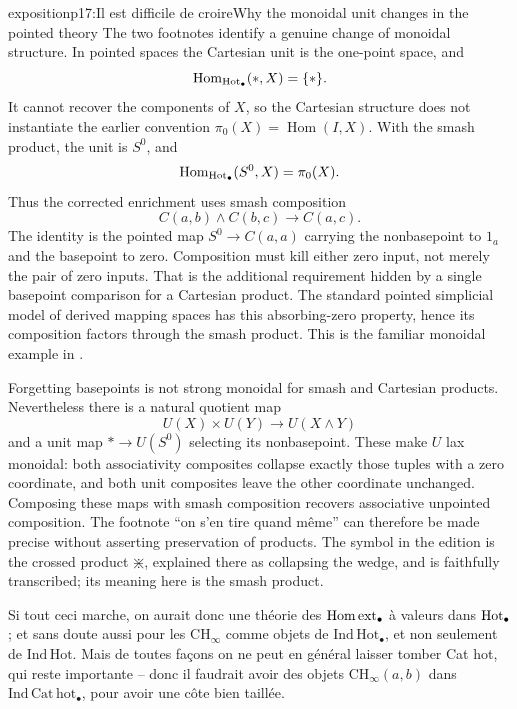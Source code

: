 \begin{dcomment}{exposition}{p17:Il est difficile de croire}{Why the monoidal unit changes in the pointed theory}
The two footnotes identify a genuine change of monoidal structure. In pointed spaces the Cartesian unit is the one-point space, and
\[
 \operatorname{Hom}_{\mathrm{Hot}_\bullet}(*,X)=\{*\}.
\]
It cannot recover the components of $X$, so the Cartesian structure does not instantiate the earlier convention $\pi_0(X)=\operatorname{Hom}(I,X)$. With the smash product, the unit is $S^0$, and
\[
 \operatorname{Hom}_{\mathrm{Hot}_\bullet}(S^0,X)=\pi_0(X).
\]
Thus the corrected enrichment uses smash composition
\[
 C(a,b)\wedge C(b,c)\longrightarrow C(a,c).
\]
The identity is the pointed map $S^0\to C(a,a)$ carrying the nonbasepoint to $1_a$ and the basepoint to zero. Composition must kill either zero input, not merely the pair of zero inputs. That is the additional requirement hidden by a single basepoint comparison for a Cartesian product. The standard pointed simplicial model of derived mapping spaces has this absorbing-zero property, hence its composition factors through the smash product. This is the familiar monoidal example in \citet[\S1.1]{Kelly1982}.

Forgetting basepoints is not strong monoidal for smash and Cartesian products. Nevertheless there is a natural quotient map
\[
 U(X)\times U(Y)\longrightarrow U(X\wedge Y)
\]
and a unit map $*\to U(S^0)$ selecting its nonbasepoint. These make $U$ lax monoidal: both associativity composites collapse exactly those tuples with a zero coordinate, and both unit composites leave the other coordinate unchanged. Composing these maps with smash composition recovers associative unpointed composition. The footnote ``on s'en tire quand m\^eme'' can therefore be made precise without asserting preservation of products. The symbol in the edition is the crossed product $\divideontimes$, explained there as collapsing the wedge, and is faithfully transcribed; its meaning here is the smash product.
\end{dcomment}


Si tout ceci marche, on aurait donc une théorie des $\mathrm{Hom\,ext}_{\bullet}$ à valeurs dans $\mathrm{Hot}_{\bullet}$; et sans doute aussi pour les $\mathrm{CH}_{\infty}$ comme objets de $\mathrm{Ind\,Hot}_{\bullet}$, et non seulement de $\mathrm{Ind\,Hot}$. Mais
de toutes façons on ne peut en général laisser tomber Cat hot, qui reste importante -- donc il faudrait avoir des objets $\mathrm{CH}_{\infty}(a,b)$ dans $\mathrm{Ind\,Cat\,hot}_{\bullet}$, pour avoir une côte bien taillée.

